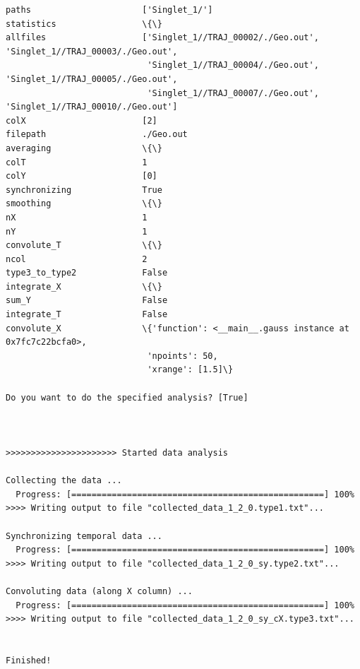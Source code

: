 \documentclass[a4paper,11pt,DIV=15,openany]{scrbook}
\begin{document}
\begin{oframed}
\begin{Verbatim}[commandchars=\\\{\}]
paths                      ['Singlet_1/']
statistics                 \{\}
allfiles                   ['Singlet_1//TRAJ_00002/./Geo.out', 'Singlet_1//TRAJ_00003/./Geo.out',
                            'Singlet_1//TRAJ_00004/./Geo.out', 'Singlet_1//TRAJ_00005/./Geo.out',
                            'Singlet_1//TRAJ_00007/./Geo.out', 'Singlet_1//TRAJ_00010/./Geo.out']
colX                       [2]
filepath                   ./Geo.out
averaging                  \{\}
colT                       1
colY                       [0]
synchronizing              True
smoothing                  \{\}
nX                         1
nY                         1
convolute_T                \{\}
ncol                       2
type3_to_type2             False
integrate_X                \{\}
sum_Y                      False
integrate_T                False
convolute_X                \{'function': <__main__.gauss instance at 0x7fc7c22bcfa0>, 
                            'npoints': 50, 
                            'xrange': [1.5]\}

Do you want to do the specified analysis? [True] 



>>>>>>>>>>>>>>>>>>>>>> Started data analysis

Collecting the data ...
  Progress: [==================================================] 100%
>>>> Writing output to file "collected_data_1_2_0.type1.txt"...

Synchronizing temporal data ...
  Progress: [==================================================] 100%
>>>> Writing output to file "collected_data_1_2_0_sy.type2.txt"...

Convoluting data (along X column) ...
  Progress: [==================================================] 100%
>>>> Writing output to file "collected_data_1_2_0_sy_cX.type3.txt"...


Finished!
\end{Verbatim}
\end{oframed}
\end{document}
